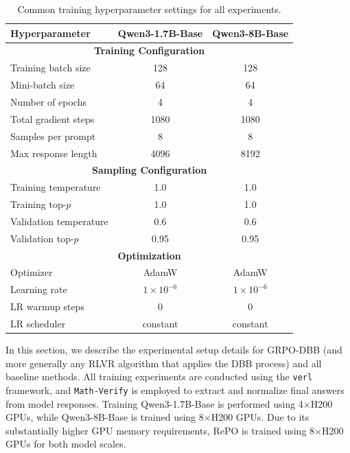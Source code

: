 \FloatBarrier
\begin{table}[htbp]
\centering
\small
\setlength{\tabcolsep}{6pt}
\caption{Common training hyperparameter settings for all experiments.}
\label{tab:hyperparams}
\begin{tabular}{lcc}
\toprule
\textbf{Hyperparameter} 
& \textbf{Qwen3-1.7B-Base} 
& \textbf{Qwen3-8B-Base} \\

\midrule
\multicolumn{3}{c}{\textbf{Training Configuration}} \\
\midrule
Training batch size        & 128  & 128 \\
Mini-batch size            & 64   & 64  \\
Number of epochs           & 4    & 4 \\
Total gradient steps       & 1080  & 1080 \\
Samples per prompt         & 8    & 8  \\
Max response length        & 4096 & 8192 \\

\midrule
\multicolumn{3}{c}{\textbf{Sampling Configuration}} \\
\midrule
Training temperature       & 1.0  & 1.0 \\
Training top-$p$           & 1.0  & 1.0 \\
Validation temperature     & 0.6  & 0.6 \\
Validation top-$p$         & 0.95  & 0.95 \\

\midrule
\multicolumn{3}{c}{\textbf{Optimization}} \\
\midrule

Optimizer                  & AdamW & AdamW \\
Learning rate              & $1\times10^{-6}$ & $1\times10^{-6}$ \\
LR warmup steps            & 0    & 0 \\
LR scheduler               & constant & constant \\

\bottomrule
\end{tabular}
\end{table}
\FloatBarrier


In this section, we describe the experimental setup details for GRPO-DBB (and more generally any RLVR algorithm that applies the DBB process) and all baseline methods.
All training experiments are conducted using the \texttt{verl} framework, and \texttt{Math-Verify} is employed to extract and normalize final answers from model responses.
Training Qwen3-1.7B-Base is performed using 4$\times$H200 GPUs, while Qwen3-8B-Base is trained using 8$\times$H200 GPUs.
Due to its substantially higher GPU memory requirements, RePO is trained using 8$\times$H200 GPUs for both model scales.

